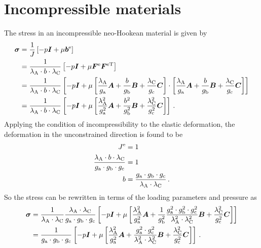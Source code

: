 \documentclass[10pt,letterpaper,oneside]{report}
\newcommand{\ten}[1]{\mbox{\boldmath $#1$}{}}
\newcommand{\scas}[1]{\mbox{{\scriptsize{${\rm{#1}}$}}}{}}
\begin{document}
\section{Incompressible materials}
The stress in an incompressible neo-Hookean material is given by
\begin{align}
\ten{\sigma} &= \frac{1}{J} \left[ - p \ten{I} + \mu \ten{b}^{\scas{e}} \right] \\
&= \frac{1}{\lambda_{\scas{A}} \cdot b \cdot \lambda_{\scas{C}}} \left[ - p \ten{I} + \mu \ten{F}^{\scas{e}} \ten{F}^{\scas{eT}} \right] \\
&= \frac{1}{\lambda_{\scas{A}} \cdot b \cdot \lambda_{\scas{C}}} \left[ - p \ten{I} + \mu \left[ \frac{\lambda_{\scas{A}} }{g_{\scas{a}}} \ten{A} + \frac{b}{g_{\scas{b}}} \ten{B} + \frac{\lambda_{\scas{C}} }{g_{\scas{c}}} \ten{C} \right] \cdot \left[ \frac{\lambda_{\scas{A}} }{g_{\scas{a}}} \ten{A} + \frac{b}{g_{\scas{b}}} \ten{B} + \frac{\lambda_{\scas{C}} }{g_{\scas{c}}} \ten{C} \right] \right] \\
&= \frac{1}{\lambda_{\scas{A}} \cdot b \cdot \lambda_{\scas{C}}} \left[ - p \ten{I} + \mu \left[ \frac{\lambda_{\scas{A}}^2}{g_{\scas{a}}^2} \ten{A} + \frac{b^2}{g_{\scas{b}}^2} \ten{B} + \frac{\lambda_{\scas{C}}^2}{g_{\scas{c}}^2} \ten{C} \right] \right]  \, .
\end{align}
Applying the condition of incompressibility to the elastic deformation, the deformation in the unconstrained direction is found to be
\begin{align}
J^{\scas{e}} &= 1 \\ 
\frac{\lambda_{\scas{A}} \cdot b \cdot \lambda_{\scas{C}} }{g_{\scas{a}} \cdot g_{\scas{b}} \cdot g_{\scas{c}}} &= 1 \\
b &= \frac{g_{\scas{a}} \cdot g_{\scas{b}} \cdot g_{\scas{c}}}{\lambda_{\scas{A}} \cdot \lambda_{\scas{C}} } \, .
\end{align}
So the stress can be rewritten in terms of the loading parameters and pressure as
\begin{align}
\ten{\sigma} &= \frac{1}{\lambda_{\scas{A}} \cdot \lambda_{\scas{C}}} \frac{\lambda_{\scas{A}} \cdot \lambda_{\scas{C}} }{g_{\scas{a}} \cdot g_{\scas{b}} \cdot g_{\scas{c}}} \left[ - p \ten{I} + \mu \left[ \frac{\lambda_{\scas{A}}^2}{g_{\scas{a}}^2} \ten{A} + \frac{1}{g_{\scas{b}}^2} \frac{g_{\scas{a}}^2 \cdot g_{\scas{b}}^2 \cdot g_{\scas{c}}^2}{\lambda_{\scas{A}}^2 \cdot \lambda_{\scas{C}}^2 } \ten{B} + \frac{\lambda_{\scas{C}}^2}{g_{\scas{c}}^2} \ten{C} \right] \right] \\
&= \frac{1}{g_{\scas{a}} \cdot g_{\scas{b}} \cdot g_{\scas{c}}} \left[ - p \ten{I} + \mu \left[ \frac{\lambda_{\scas{A}}^2}{g_{\scas{a}}^2} \ten{A} + \frac{g_{\scas{a}}^2 \cdot g_{\scas{c}}^2}{\lambda_{\scas{A}}^2 \cdot \lambda_{\scas{C}}^2 } \ten{B} + \frac{\lambda_{\scas{C}}^2}{g_{\scas{c}}^2} \ten{C} \right] \right]  \, .
\end{align}
\end{document}
